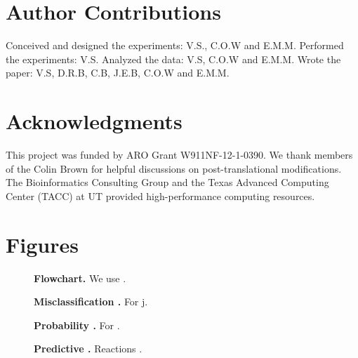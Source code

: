 \documentclass[12pt]{article}
\begin{document}
\section{Author Contributions}
Conceived and designed the experiments: V.S., C.O.W and E.M.M. Performed the experiments: V.S. Analyzed the data: V.S, C.O.W and E.M.M. Wrote the paper: V.S, D.R.B, C.B, J.E.B, C.O.W and E.M.M.

\section{Acknowledgments}
This project was funded by ARO Grant W911NF-12-1-0390. We thank members of the Colin Brown for helpful discussions on post-translational modifications. The Bioinformatics Consulting Group and the Texas Advanced Computing Center (TACC) at UT provided high-performance computing resources. 




\newpage

\section*{Figures}

\begin{figure}[!ht]
\caption{\label{fig:flowchart}\textbf{Flowchart.} We use .
}
\end{figure}

\clearpage
\begin{figure}[!ht]
\caption{\label{fig:misclassification}\textbf{Misclassification .} For j.}
\end{figure}

\clearpage
\begin{figure}[p]
\caption{\label{fig:heat_map}\textbf{Probability .} For .}
\end{figure}

\clearpage
\begin{figure}[p]
\caption{\label{fig:carbon_network}\textbf{Predictive .} Reactions .}
\end{figure}
\end{document}
